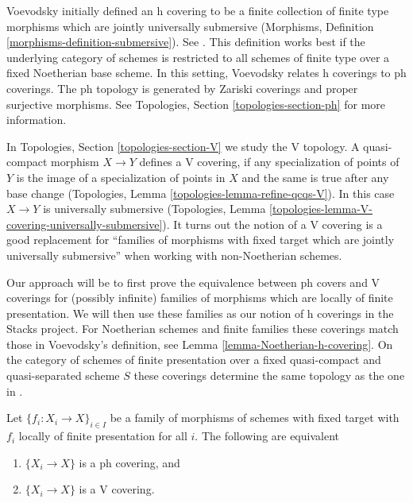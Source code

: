 \medskip\noindent
Voevodsky initially defined an
h covering to be a finite collection of finite type morphisms which are
jointly universally submersive (Morphisms, Definition
\ref{morphisms-definition-submersive}). See \cite[Definition 3.1.2]{Voevodsky}.
This definition works best if the underlying category of schemes is
restricted to all schemes of finite type over a fixed Noetherian base scheme.
In this setting, Voevodsky relates h coverings to ph coverings.
The ph topology is generated by Zariski coverings and proper
surjective morphisms. See Topologies, Section \ref{topologies-section-ph}
for more information.

\medskip\noindent
In Topologies, Section \ref{topologies-section-V} we study the V topology.
A quasi-compact morphism $X \to Y$ defines a V covering, if any specialization
of points of $Y$ is the image of a specialization of points in $X$
and the same is true after any base change
(Topologies, Lemma \ref{topologies-lemma-refine-qcqs-V}).
In this case $X \to Y$ is universally submersive
(Topologies, Lemma \ref{topologies-lemma-V-covering-universally-submersive}).
It turns out the notion of a V covering is a good replacement for
``families of morphisms with fixed target which are
jointly universally submersive'' when working with non-Noetherian schemes.

\medskip\noindent
Our approach will be to first prove the equivalence between ph covers and
V coverings for (possibly infinite) families of morphisms which are
locally of finite presentation. We will then use these families
as our notion of h coverings in the Stacks project.
For Noetherian schemes and finite families these coverings
match those in Voevodsky's definition, see
Lemma \ref{lemma-Noetherian-h-covering}.
On the category of schemes of finite presentation over a fixed
quasi-compact and quasi-separated scheme $S$ these coverings
determine the same topology as the one in \cite[Definition 2.7]{Witt-Grass}.

\begin{lemma}
\label{lemma-equivalence-h-v-locally-finite-presentation}
Let $\{f_i : X_i \to X\}_{i \in I}$ be a family of morphisms
of schemes with fixed target with $f_i$ locally of finite
presentation for all $i$. The following are equivalent
\begin{enumerate}
\item $\{X_i \to X\}$ is a ph covering, and
\item $\{X_i \to X\}$ is a V covering.
\end{enumerate}
\end{lemma}

